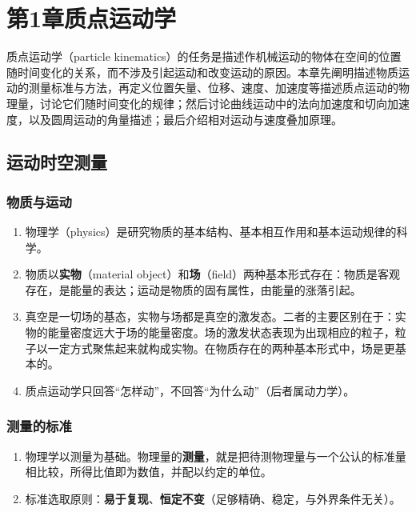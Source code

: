 \chapter{第1章\texorpdfstring{\hspace{0.5em}}{ }质点运动学}

质点运动学（particle kinematics）的任务是描述作机械运动的物体在空间的位置随时间变化的关系，而不涉及引起运动和改变运动的原因。本章先阐明描述物质运动的测量标准与方法，再定义位置矢量、位移、速度、加速度等描述质点运动的物理量，讨论它们随时间变化的规律；然后讨论曲线运动中的法向加速度和切向加速度，以及圆周运动的角量描述；最后介绍相对运动与速度叠加原理。

\section{运动\texorpdfstring{\hspace{0.5em}}{ }时空\texorpdfstring{\hspace{0.5em}}{ }测量}
    \subsection{物质与运动}
    \begin{enumerate}
        \item 物理学（physics）是研究物质的基本结构、基本相互作用和基本运动规律的科学。
        \item 物质以\textbf{实物}（material object）和\textbf{场}（field）两种基本形式存在：物质是客观存在，是能量的表达；运动是物质的固有属性，由能量的涨落引起。
        \item 真空是一切场的基态，实物与场都是真空的激发态。二者的主要区别在于：实物的能量密度远大于场的能量密度。场的激发状态表现为出现相应的粒子，粒子以一定方式聚焦起来就构成实物。在物质存在的两种基本形式中，场是更基本的。
        \item 质点运动学只回答“怎样动”，不回答“为什么动”（后者属动力学）。
    \end{enumerate}

    \subsection{测量的标准}
    \begin{enumerate}
        \item 物理学以测量为基础。物理量的\textbf{测量}，就是把待测物理量与一个公认的标准量相比较，所得比值即为数值，并配以约定的单位。
        \item 标准选取原则：\textbf{易于复现}、\textbf{恒定不变}（足够精确、稳定，与外界条件无关）。
    \end{enumerate}

